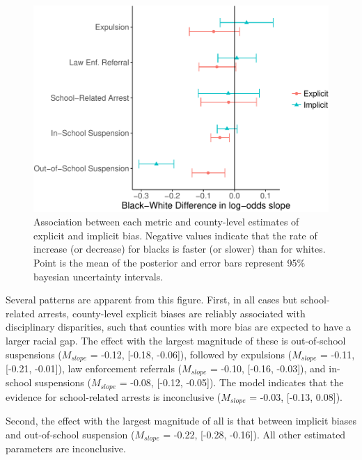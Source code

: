 \documentclass[english,floatsintext,man]{apa6}
\theoremstyle{definition}
\theoremstyle{definition}
\theoremstyle{remark}
\begin{document}
\begin{figure}
\centering
\includegraphics{draft_files/figure-latex/overall-associations-1.pdf}
\caption{\label{fig:overall-associations}Association between each metric and
county-level estimates of explicit and implicit bias. Negative values
indicate that the rate of increase (or decrease) for blacks is faster
(or slower) than for whites. Point is the mean of the posterior and
error bars represent 95\% bayesian uncertainty intervals.}
\end{figure}

Several patterns are apparent from this figure. First, in all cases but
school-related arrests, county-level explicit biases are reliably
associated with disciplinary disparities, such that counties with more
bias are expected to have a larger racial gap. The effect with the
largest magnitude of these is out-of-school suspensions (\(M_{slope}\) =
-0.12, {[}-0.18, -0.06{]}), followed by expulsions (\(M_{slope}\) =
-0.11, {[}-0.21, -0.01{]}), law enforcement referrals (\(M_{slope}\) =
-0.10, {[}-0.16, -0.03{]}), and in-school suspensions (\(M_{slope}\) =
-0.08, {[}-0.12, -0.05{]}). The model indicates that the evidence for
school-related arrests is inconclusive (\(M_{slope}\) = -0.03, {[}-0.13,
0.08{]}).

Second, the effect with the largest magnitude of all is that between
implicit biases and out-of-school suspension (\(M_{slope}\) = -0.22,
{[}-0.28, -0.16{]}). All other estimated parameters are inconclusive.
\end{document}
